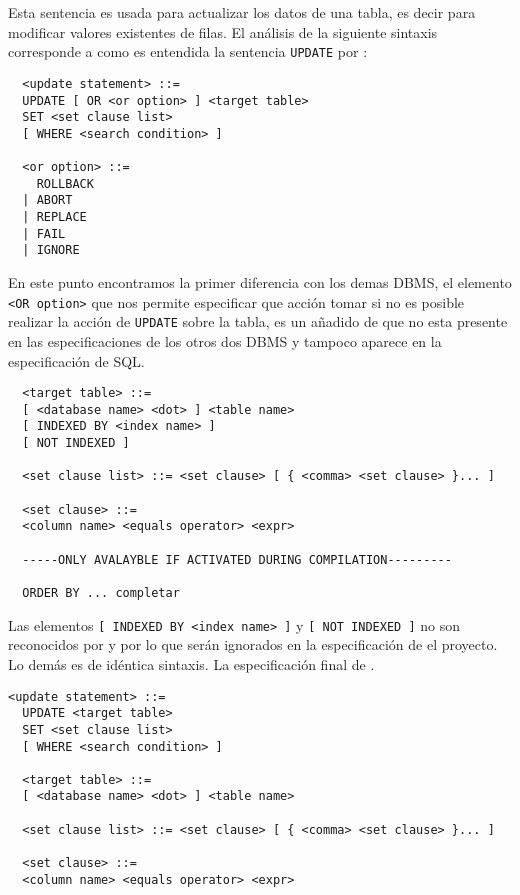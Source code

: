 Esta sentencia es usada para actualizar los datos de una tabla, es decir para modificar valores existentes de filas. El análisis de la siguiente sintaxis corresponde a como es entendida la sentencia \verb=UPDATE= por \s: 

\begin{Verbatim}
  <update statement> ::=
  UPDATE [ OR <or option> ] <target table> 
  SET <set clause list>
  [ WHERE <search condition> ]
  
  <or option> ::=
    ROLLBACK
  | ABORT
  | REPLACE
  | FAIL
  | IGNORE
\end{Verbatim}

En este punto encontramos la primer diferencia con los demas DBMS, el elemento \verb=<OR option>= que nos permite especificar que acción tomar si no es posible realizar la acción de \verb=UPDATE= sobre la tabla, es un añadido de \s que no esta presente en las especificaciones de los otros dos DBMS y tampoco aparece en la especificación de SQL.

\begin{Verbatim}
  <target table> ::=
  [ <database name> <dot> ] <table name>
  [ INDEXED BY <index name> ]
  [ NOT INDEXED ]
  
  <set clause list> ::= <set clause> [ { <comma> <set clause> }... ]

  <set clause> ::=
  <column name> <equals operator> <expr>
  
  -----ONLY AVALAYBLE IF ACTIVATED DURING COMPILATION---------
  
  ORDER BY ... completar

\end{Verbatim}
Las elementos \verb=[ INDEXED BY <index name> ]= y \verb=[ NOT INDEXED ]= no son reconocidos por \m y \p por lo que serán ignorados en la especificación de el proyecto. Lo demás es de idéntica sintaxis. La especificación final de \jj.
\begin{Verbatim}[frame=single, label=sintaxis para UPDATE]
  <update statement> ::=
  UPDATE <target table> 
  SET <set clause list>
  [ WHERE <search condition> ]
  
  <target table> ::=
  [ <database name> <dot> ] <table name>
  
  <set clause list> ::= <set clause> [ { <comma> <set clause> }... ]

  <set clause> ::=
  <column name> <equals operator> <expr>    
\end{Verbatim}




